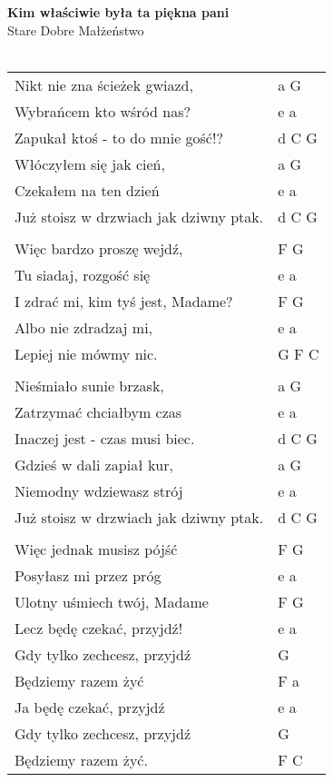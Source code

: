 \documentclass[a5paper]{article}
\begin{document}


\noindent
\fontsize{12pt}{15pt}\selectfont
\textbf{Kim właściwie była ta piękna pani} \\
\fontsize{8pt}{10pt}\selectfont
Stare Dobre Małżeństwo \\ \\
\fontsize{10pt}{12pt}\selectfont
{}
\begin{tabular}{@{}p{8.50cm}p{3cm}@{}}
\noindent
Nikt nie zna ścieżek gwiazd, & a G \\
Wybrańcem kto wśród nas? & e a \\
Zapukał ktoś - to do mnie gość!? & d C G \\
Włóczyłem się jak cień, & a G \\
Czekałem na ten dzień & e a \\
Już stoisz w drzwiach jak dziwny ptak. & d C G \\ \\

Więc bardzo proszę wejdź, & F G \\
Tu siadaj, rozgość się & e a \\
I zdrać mi, kim tyś jest, Madame? & F G \\
Albo nie zdradzaj mi, & e a \\
Lepiej nie mówmy nic. & G F C \\ \\

Nieśmiało sunie brzask, & a G \\
Zatrzymać chciałbym czas & e a\\
Inaczej jest - czas musi biec. & d C G\\
Gdzieś w dali zapiał kur, & a G\\
Niemodny wdziewasz strój & e a\\
Już stoisz w drzwiach jak dziwny ptak. & d C G\\ \\

Więc jednak musisz pójść & F G \\
Posyłasz mi przez próg & e a \\
Ulotny uśmiech twój, Madame & F G \\
Lecz będę czekać, przyjdź! & e a \\
Gdy tylko zechcesz, przyjdź & G \\
Będziemy razem żyć & F a \\
Ja będę czekać, przyjdź & e a \\
Gdy tylko zechcesz, przyjdź	& G \\
Będziemy razem żyć.	& F C
\end{tabular}
\end{document}
